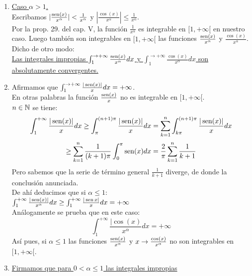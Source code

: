\begin{enumerate}[1)]
\item \underline{Caso $\alpha>1$.}\\
Escribamos $| \frac{\operatorname{sen} (x)}{x^\alpha}| < \frac{1}{x^\alpha}$ y $|\frac{\cos (x)}{x^{\alpha}}| \leq \frac{1}{x^\alpha}$.\\
Por la prop. 29. del cap. V, la función \x \flecha $\frac{1}{x^\alpha}$ es integrable en $[1,+\infty[$ en nuestro caso. Luego también son integrables en $[1,+\infty[$ las funciones \x \flecha $\frac{\operatorname{sen} (x)}{x^\alpha}$ y \x \flecha $\frac{\cos (x)}{x^\alpha}$. Dicho de otro modo:\\
\underline{Las integrales impropias $\int_1^{\to +\infty}\frac{\operatorname{sen} (x)}{x^\alpha}dx$ y $\int_1^{\to + \infty}\frac{\cos (x)}{x^\alpha}dx$ son}\\
\underline{absolutamente convergentes.}\\
\item Afirmamos que $\int_1^{\to +\infty}\frac{|\operatorname{sen} (x)|}{x}dx=+\infty$.\\
En otras palabras la función \x \flecha $\frac{\operatorname{sen} (x)}{x}$ no es integrable en $[1,+\infty[$.\\
\todo $n \in \mathbb{N}$ se tiene:\\
\begin{equation*}
\int_1^{+\infty}\frac{|\operatorname{sen} (x)|}{x}dx \geq \int_\pi^{(n+1)\pi}\frac{|\operatorname{sen} (x)|}{x}dx=\sum_{k=1}^n\int_{k\pi}^{(n+1)\pi}\frac{|\operatorname{sen} (x)|}{x}dx
\end{equation*}
\begin{equation*}
\geq \sum_{k=1}^n \frac{1}{(k+1)\pi}\int_0^\pi \operatorname{sen} (x)dx=\frac{2}{\pi} \sum_{k=1}^n \frac{1}{
k+1}
\end{equation*}
Pero sabemos que la serie de término general $\frac{1}{k+1}$ diverge, de donde la conclusión anunciada. \\
De ahí deducimos que si $\alpha \leq 1$:\\
$\int_1^{+\infty} \frac{|\operatorname{sen} (x)|}{x^\alpha}dx \geq \int_1^{+\infty}\frac{|\operatorname{sen} x|}{x}dx= +\infty$
\\
Análogamente se prueba que en este caso:\\
\begin{equation*}
\int_1^{+\infty}\frac{|\cos (x)}{x^\alpha}dx=+\infty
\end{equation*}
Así pues, si $\alpha \leq 1$ las funciones \x \flecha $\frac{\operatorname{sen} (x)}{x^\alpha}$ y $x \rightarrow \frac{\cos (x)}{x^\alpha}$ no son integrables en $[1,+\infty[$.\\
\item \underline{Firmamos que para $0< \alpha \leq 1$ las integrales impropias
}
\end{enumerate}

